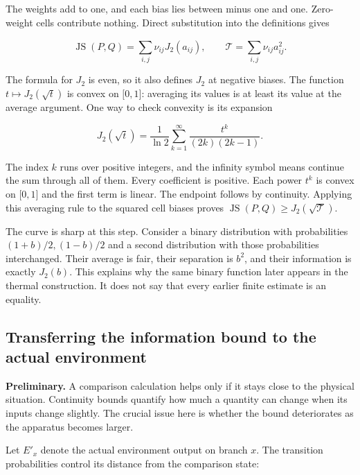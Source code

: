 \documentclass[11pt,letterpaper]{article}
\begin{document}
The weights add to one, and each bias lies between minus one and one. Zero-weight cells contribute nothing. Direct substitution into the definitions gives

\[\operatorname{JS}(P,Q) = \sum_{i,j}^{}\nu_{ij}J_{2}\left( a_{ij} \right),\quad\quad\mathcal{T} = \sum_{i,j}^{}\nu_{ij}a_{ij}^{2}.\]

The formula for \(J_{2}\) is even, so it also defines \(J_{2}\) at negative biases. The function \(t \mapsto J_{2}\left( \sqrt{t} \right)\) is convex on \(\lbrack 0,1\rbrack\): averaging its values is at least its value at the average argument. One way to check convexity is its expansion

\[J_{2}\left( \sqrt{t} \right) = \frac{1}{\ln 2}\sum_{k = 1}^{\infty}\frac{t^{k}}{(2k)(2k - 1)}.\]

The index \(k\) runs over positive integers, and the infinity symbol means continue the sum through all of them. Every coefficient is positive. Each power \(t^{k}\) is convex on \(\lbrack 0,1\rbrack\) and the first term is linear. The endpoint follows by continuity. Applying this averaging rule to the squared cell biases proves \(\operatorname{JS}(P,Q) \geq J_{2}\left( \sqrt{\mathcal{T}} \right)\).

The curve is sharp at this step. Consider a binary distribution with probabilities \((1 + b)/2,(1 - b)/2\) and a second distribution with those probabilities interchanged. Their average is fair, their separation is \(b^{2}\), and their information is exactly \(J_{2}(b)\). This explains why the same binary function later appears in the thermal construction. It does not say that every earlier finite estimate is an equality.

\subsection{Transferring the information bound to the actual environment}\label{subsec:actual-environment}

\textbf{Preliminary.} A comparison calculation helps only if it stays close to the physical situation. Continuity bounds quantify how much a quantity can change when its inputs change slightly. The crucial issue here is whether the bound deteriorates as the apparatus becomes larger.

Let \(E\prime_{x}\) denote the actual environment output on branch \(x\). The transition probabilities control its distance from the comparison state:
\end{document}
